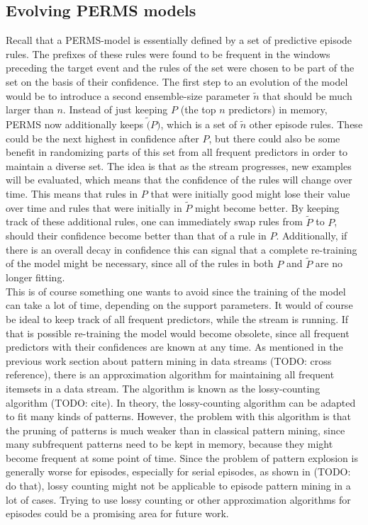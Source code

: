 \subsection{Evolving PERMS models}
Recall that a PERMS-model is essentially defined by a set of predictive episode rules. The prefixes of these rules were found to be frequent in the windows preceding the target event and the rules of the set were chosen to be part of the set on the basis of their confidence. The first step to an evolution of the model would be to introduce a second ensemble-size parameter $\tilde{n}$ that should be much larger than $n$. Instead of just keeping $P$ (the top $n$ predictors) in memory, PERMS now additionally keeps $\tilde(P)$, which is a set of $\tilde{n}$ other episode rules. These could be the next highest in confidence after $P$, but there could also be some benefit in randomizing parts of this set from all frequent predictors in order to maintain a diverse set. The idea is that as the stream progresses, new examples will be evaluated, which means that the confidence of the rules will change over time. This means that rules in $P$ that were initially good might lose their value over time and rules that were initially in $\tilde{P}$ might become better. By keeping track of these additional rules, one can immediately swap rules from $\tilde{P}$ to $P$, should their confidence become better than that of a rule in $P$. Additionally, if there is an overall decay in confidence this can signal that a complete re-training of the model might be necessary, since all of the rules in both $P$ and $\tilde{P}$ are no longer fitting. \\
This is of course something one wants to avoid since the training of the model can take a lot of time, depending on the support parameters. It would of course be ideal to keep track of all frequent predictors, while the stream is running. If that is possible re-training the model would become obsolete, since all frequent predictors with their confidences are known at any time. As mentioned in the previous work section about pattern mining in data streams (TODO: cross reference), there is an approximation algorithm for maintaining all frequent itemsets in a data stream. The algorithm is known as the lossy-counting algorithm (TODO: cite). In theory, the lossy-counting algorithm can be adapted to fit many kinds of patterns.  However, the problem with this algorithm is that the pruning of patterns is much weaker than in classical pattern mining, since many subfrequent patterns need to be kept in memory, because they might become frequent at some point of time. Since the problem of pattern explosion is generally worse for episodes, especially for serial episodes, as shown in (TODO: do that), lossy counting might not be applicable to episode pattern mining in a lot of cases. Trying to use lossy counting or other approximation algorithms for episodes could be a promising area for future work.

